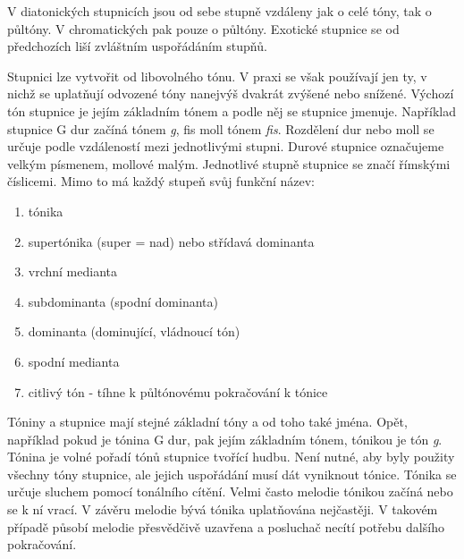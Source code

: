 V diatonických stupnicích jsou od sebe stupně vzdáleny jak o celé tóny, tak o půltóny.
V chromatických pak pouze o půltóny.
Exotické stupnice se od předchozích liší zvláštním uspořádáním stupňů.
\cite{kofron}
\par

Stupnici lze vytvořit od libovolného tónu.
V praxi se však používají jen ty, 
v nichž se uplatňují odvozené tóny nanejvýš dvakrát zvýšené nebo snížené.
Výchozí tón stupnice je jejím základním tónem a podle něj se stupnice jmenuje.
Například stupnice G dur začíná tónem \emph{g}, fis moll tónem \emph{fis}.
Rozdělení dur nebo moll se určuje podle vzdáleností mezi jednotlivými stupni.
\cite{zenkl}
Durové stupnice označujeme velkým písmenem, mollové malým.
Jednotlivé stupně stupnice se značí římskými číslicemi.
Mimo to má každý stupeň svůj funkční název:
\cite{kofron}

\begin{enumerate} [label=\Roman*]
    \item tónika
    \item supertónika (super = nad) nebo střídavá dominanta
    \item vrchní medianta
    \item subdominanta (spodní dominanta)
    \item dominanta (dominující, vládnoucí tón)
    \item spodní medianta
    \item citlivý tón - tíhne k půltónovému pokračování k tónice
\end{enumerate}
\par

Tóniny a stupnice mají stejné základní tóny a od toho také jména.
Opět, například pokud je tónina G dur, pak jejím základním tónem, tónikou je tón \emph{g}.
Tónina je volné pořadí tónů stupnice tvořící hudbu.
Není nutné, aby byly použity všechny tóny stupnice, 
ale jejich uspořádání musí dát vyniknout tónice.
Tónika se určuje sluchem pomocí tonálního cítění.
Velmi často melodie tónikou začíná nebo se k ní vrací.
V závěru melodie bývá tónika uplatňována nejčastěji.
V takovém případě působí melodie přesvědčivě uzavřena 
a posluchač necítí potřebu dalšího pokračování.
\cite{zenkl}
\par

